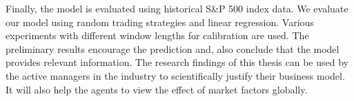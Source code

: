 Finally, the model is evaluated using historical S\&P 500 index data. We evaluate our model using random trading strategies and linear regression. Various experiments with different window lengths for calibration are used. The preliminary results encourage the prediction and, also conclude that the model provides relevant information. The research findings of this thesis can be used by the active managers in the industry to scientifically justify their business model. It will also help the agents to view the effect of market factors globally.